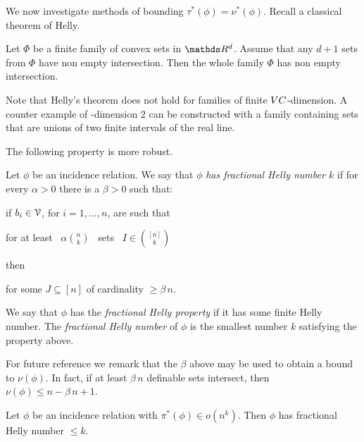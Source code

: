 \documentclass[sputnik.tex]{subfiles}
\begin{document}
We now investigate methods of bounding $\tau^*(\phi)=\nu^*(\phi)$.
Recall a classical theorem of Helly.

\begin{proposition}
Let $\Phi$ be a finite family of convex sets in $\RR^d$.
Assume that any $d+1$ sets from $\Phi$ have non empty intersection.
Then the whole family $\Phi$ has non empty intersection.
\end{proposition}

Note that Helly's theorem does not hold for families of finite ${\footnotesize VC}$-dimension.
A counter example of \vc-dimension $2$ can be constructed with a family containing sets that are unions of two finite intervals of the real line.

The following property is more robust.

\begin{definition}
Let $\phi$ be an incidence relation.
We say that $\phi$ \emph{has fractional Helly number $k$\/} if for every $\alpha>0$ there is a $\beta>0$ such that:

if $b_i\in\EuScript V$, for $i=1,\dots,n$, are such that

\hfill for at least \ $\displaystyle\alpha{n\choose k}$ \ sets \ $\displaystyle I\in{[n]\choose k}$

then

\hfill for some $J\subseteq [n]$ of cardinality $\ge\beta\,n$.

We say that $\phi$ has the \emph{fractional Helly property\/} if it has some finite Helly number.
The \emph{fractional Helly number\/} of $\phi$ is the smallest number $k$ satisfying the property above.
\QED
\end{definition}

For future reference we remark that the $\beta$ above may be used to obtain a bound to $\nu(\phi)$. In fact, if at least $\beta\,n$ definable sets intersect, then $\nu(\phi)\le n-\beta\,n+1$.  

\begin{theorem}
Let $\phi$ be an incidence relation with $\pi^*(\phi)\in o(n^k)$.
Then $\phi$ has fractional Helly number $\le k$.
\end{theorem}
\end{document}
